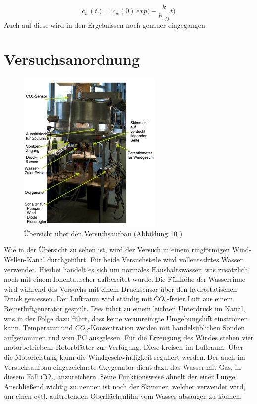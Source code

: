 \documentclass[12pt]{article}
\begin{document}
\begin{equation}
c_w(t) = c_w(0) \, exp\Big(- \frac{k}{h_{eff}}t\Big)
\end{equation}
Auch auf diese wird in den Ergebnissen noch genauer eingegangen.








\section{Versuchsanordnung}

\begin{figure}[H]
	\centering
	\includegraphics[width=70mm]{Versuchsaufbau}
	\caption{Übersicht über den Versuchsaufbau (Abbildung 10 \cite{jaehne})}
\end{figure}

Wie in der Übersicht zu sehen ist, wird der Versuch in einem ringförmigen Wind-Wellen-Kanal durchgeführt. Für beide Versuchsteile wird vollentsalztes Wasser verwendet. Hierbei handelt es sich um normales Haushaltswasser, was zusätzlich noch mit einem Ionentauscher aufbereitet wurde. Die Füllhöhe der Wasserrinne wird während des Versuchs mit einem Drucksensor über den hydrostatischen Druck gemessen. Der Luftraum wird ständig mit $CO_2$-freier Luft aus einem Reinstluftgenerator gespült. Dies führt zu einem leichten Unterdruck im Kanal, was in der Folge dazu führt, dass keine verunreinigte Umgebungsluft einströmen kann. Temperatur und $CO_2$-Konzentration werden mit handelsüblichen Sonden aufgenommen und vom PC ausgelesen. Für die Erzeugung des Windes stehen vier motorbetriebene Rotorblätter zur Verfügung. Diese kreisen im Luftraum. Über die Motorleistung kann die Windgeschwindigkeit reguliert werden. Der auch im Versuchsaufbau eingezeichnete Oxygenator dient dazu das Wasser mit Gas, in diesem Fall $CO_2$, anzureichern. Seine Funktionsweise ähnelt der einer Lunge. Anschließend wichtig zu nennen ist noch der Skimmer, welcher verwendet wird, um einen evtl. auftretenden Oberflächenfilm vom Wasser absaugen zu können.
\end{document}
